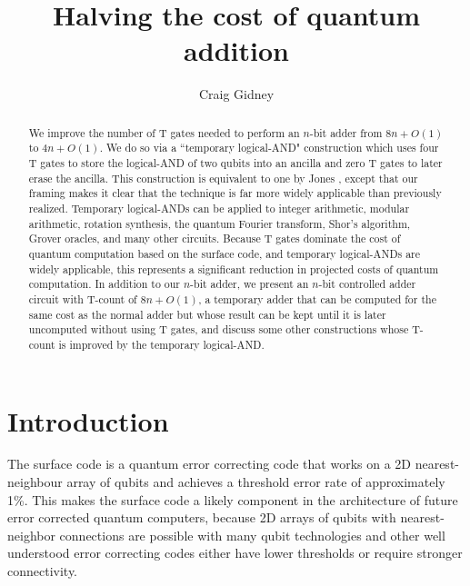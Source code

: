 \documentclass[twocolumn]{revtex4-1}
\begin{document}
\title{Halving the cost of quantum addition}
\author{Craig Gidney}

\begin{abstract}
We improve the number of T gates needed to perform an $n$-bit adder from $8n + O(1)$ \citep{Amy2013, Cuccaro2004, AustinDiscussionsAndEmails2017} to $4n + O(1)$.
We do so via a ``temporary logical-AND" construction which uses four T gates to store the logical-AND of two qubits into an ancilla and zero T gates to later erase the ancilla.
This construction is equivalent to one by Jones \cite{Jones2013}, except that our framing makes it clear that the technique is far more widely applicable than previously realized.
Temporary logical-ANDs can be applied to integer arithmetic, modular arithmetic, rotation synthesis, the quantum Fourier transform, Shor's algorithm, Grover oracles, and many other circuits.
Because T gates dominate the cost of quantum computation based on the surface code, and temporary logical-ANDs are widely applicable, this represents a significant reduction in projected costs of quantum computation.
In addition to our $n$-bit adder, we present an $n$-bit controlled adder circuit with T-count of $8n + O(1)$, a temporary adder that can be computed for the same cost as the normal adder but whose result can be kept until it is later uncomputed without using T gates, and discuss some other constructions whose T-count is improved by the temporary logical-AND.
\end{abstract}

\maketitle

\section*{Introduction}

The surface code \citep{Brav98,Denn02,Raus07,Raus07d,Fowler2012} is a quantum error correcting code that works on a 2D nearest-neighbour array of qubits and achieves a threshold error rate of approximately 1\%.
This makes the surface code a likely component in the architecture of future error corrected quantum computers, because 2D arrays of qubits with nearest-neighbor connections are possible with many qubit technologies \citep{Schl11,Bare13,Gamb17,Leik17,Laht17} and other well understood error correcting codes either have lower thresholds or require stronger connectivity.
\end{document}
